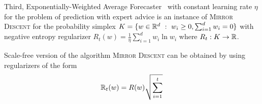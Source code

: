 Third, Exponentially-Weighted Average Forecaster~\cite[Chapter
2]{Cesa-Bianchi-Lugosi-2006} with constant learning rate $\eta$ for the problem
of prediction with expert advice is an instance of \textsc{Mirror Descent} for
the probability simplex $K = \{ w \in \mathbb{R}^d ~:~ w_i \ge 0, \sum_{i=1}^d w_i = 0
\}$ with negative entropy regularizer $R_t(w) = \frac{1}{\eta} \sum_{i=1}^d w_i
\ln w_i$ where $R_t:K \to \mathbb{R}$.



Scale-free version of the algorithm \textsc{Mirror Descent} can be obtained
by using regularizers of the form
$$
\mathbb{R}_t(w) = R(w) \sqrt{\sum_{i=1}^t }
$$
